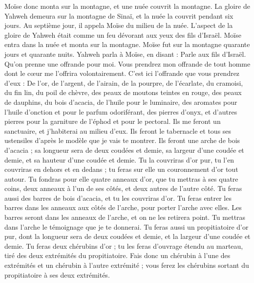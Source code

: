 \begin{multicols}{2}
Moïse donc monta sur la montagne, et une nuée couvrit la montagne.
La gloire de Yahweh demeura sur la montagne de Sinaï, et la nuée la couvrit pendant six jours. Au septième jour, il appela Moïse du milieu de la nuée.
L’aspect de la gloire de Yahweh était comme un feu dévorant aux yeux des fils d'Israël.
Moïse entra dans la nuée et monta sur la montagne. Moïse fut sur la montagne quarante jours et quarante nuits.
\VerseOne{}Yahweh parla à Moïse, en disant :
Parle aux fils d'Israël. Qu'on prenne une offrande pour moi. Vous prendrez mon offrande de tout homme dont le cœur me l'offrira volontairement.
C'est ici l'offrande que vous prendrez d'eux : De l'or, de l'argent, de l'airain,
de la pourpre, de l'écarlate, du cramoisi, du fin lin, du poil de chèvre,
des peaux de moutons teintes en rouge, des peaux de dauphins, du bois d’acacia,
de l'huile pour le luminaire, des aromates pour l'huile d'onction et pour le parfum odoriférant,
des pierres d'onyx, et d’autres pierres pour la garniture de l'éphod et pour le pectoral.
Ils me feront un sanctuaire, et j'habiterai au milieu d'eux.
Ils feront le tabernacle et tous ses ustensiles d’après le modèle que je vais te montrer.
Ils feront une arche de bois d’acacia ; sa longueur sera de deux coudées et demie, sa largeur d'une coudée et demie, et sa hauteur d'une coudée et demie.
Tu la couvriras d’or pur, tu l'en couvriras en dehors et en dedans ; tu feras sur elle un couronnement d'or tout autour.
Tu fondras pour elle quatre anneaux d'or, que tu mettras à ses quatre coins, deux anneaux à l'un de ses côtés, et deux autres de l'autre côté.
Tu feras aussi des barres de bois d’acacia, et tu les couvriras d'or.
Tu feras entrer les barres dans les anneaux aux côtés de l'arche, pour porter l'arche avec elles.
Les barres seront dans les anneaux de l'arche, et on ne les retirera point.
Tu mettras dans l'arche le témoignage que je te donnerai.
Tu feras aussi un propitiatoire d’or pur, dont la longueur sera de deux coudées et demie, et la largeur d'une coudée et demie.
Tu feras deux chérubins d'or ; tu les feras d'ouvrage étendu au marteau, tiré des deux extrémités du propitiatoire.
Fais donc un chérubin à l'une des extrémités et un chérubin à l'autre extrémité ; vous ferez les chérubins sortant du propitiatoire à ses deux extrémités.

\end{multicols}
